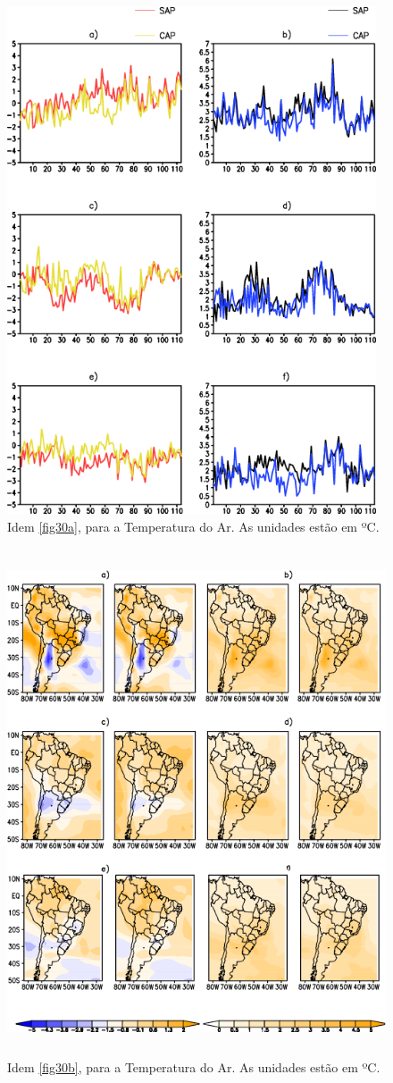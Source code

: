 \begin{figure}[!hbp]
\centering
\includegraphics[height=15cm]{./figs/vies_eqm-temp.png}
\caption{Idem \autoref{fig30a}, para a Temperatura do Ar. As unidades estão em ºC.}
\label{fig31a}
\end{figure}

\begin{figure}[!hbp]
\centering
\includegraphics[height=15cm]{./figs/campo_vies_eqm-temp.png}
\caption{Idem \autoref{fig30b}, para a Temperatura do Ar. As unidades estão em ºC.}
\label{fig31b}
\end{figure}

